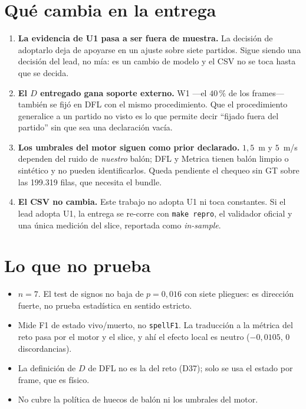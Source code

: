 \documentclass[11pt,a4paper]{article}
\begin{document}
\section{Qué cambia en la entrega}

\begin{enumerate}
\item \textbf{La evidencia de U1 pasa a ser fuera de muestra.} La decisión de adoptarlo deja de
apoyarse en un ajuste sobre siete partidos. Sigue siendo una decisión del lead, no mía: es un
cambio de modelo y el CSV no se toca hasta que se decida.
\item \textbf{El $D$ entregado gana soporte externo.} W1 ---el $40\,\%$ de los frames--- también
se fijó en DFL con el mismo procedimiento. Que el procedimiento generalice a un partido no visto
es lo que permite decir ``fijado fuera del partido'' sin que sea una declaración vacía.
\item \textbf{Los umbrales del motor siguen como prior declarado.} $1{,}5$~m y $5$~m/s dependen
del ruido de \emph{nuestro} balón; DFL y Metrica tienen balón limpio o sintético y no pueden
identificarlos. Queda pendiente el chequeo sin GT sobre las 199.319 filas, que necesita el bundle.
\item \textbf{El CSV no cambia.} Este trabajo no adopta U1 ni toca constantes. Si el lead adopta
U1, la entrega se re-corre con \texttt{make repro}, el validador oficial y una única medición del
slice, reportada como \emph{in-sample}.
\end{enumerate}

\section{Lo que no prueba}

\begin{itemize}
\item $n=7$. El test de signos no baja de $p=0{,}016$ con siete pliegues: es dirección fuerte,
no prueba estadística en sentido estricto.
\item Mide F1 de estado vivo/muerto, no \texttt{spellF1}. La traducción a la métrica del reto
pasa por el motor y el slice, y ahí el efecto local es neutro ($-0{,}0105$, $0$ discordancias).
\item La definición de $D$ de DFL no es la del reto (D37); solo se usa el estado por frame, que
es físico.
\item No cubre la política de huecos de balón ni los umbrales del motor.
\end{itemize}
\end{document}
